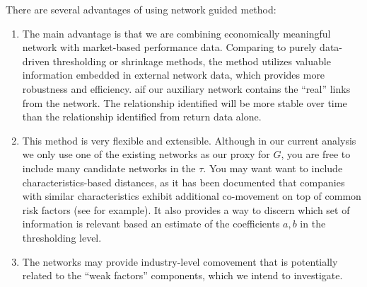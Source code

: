 There are several advantages of using network guided method:
\begin{enumerate}
    \item The main advantage is that we are combining economically meaningful network with market-based performance data. Comparing to purely data-driven thresholding or shrinkage methods, the method utilizes valuable information embedded in external network data, which provides more robustness and efficiency. aif our auxiliary network contains the ``real'' links from the network. The relationship identified will be more stable over time than the relationship identified from return data alone. 
    \item This method is very flexible and extensible. Although in our current analysis we only use one of the existing networks as our proxy for $G$, you are free to include many candidate networks in the \(\tau\). You may want want to include characteristics-based distances, as it has been documented that companies with similar characteristics exhibit additional co-movement on top of common risk factors (see \cite{fernandez2011spatial} for example). It also provides a way to discern which set of information is relevant based an estimate of the coefficients \(a,b\) in the thresholding level. 
    \item The networks may provide industry-level comovement that is potentially related to the ``weak factors'' components, which we intend to investigate. 
\end{enumerate}

